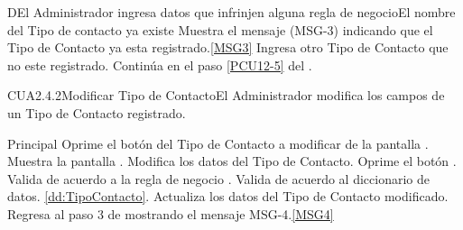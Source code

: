         \begin{UCtrayectoriaA}{D}{El Administrador ingresa datos que infrinjen alguna regla de negocio}{El nombre del Tipo de contacto ya existe}
                        \UCpaso Muestra el mensaje (MSG-3) indicando que el Tipo de Contacto ya esta registrado.\ref{MSG3}
			\UCpaso[\UCactor] Ingresa otro Tipo de Contacto que no este registrado.
			\UCpaso Continúa en el paso \ref{PCU12-5} del .
	\end{UCtrayectoriaA}



	\begin{UseCase}{CUA2.4.2}{Modificar Tipo de Contacto}{El Administrador modifica los campos de un Tipo de Contacto registrado.}
	\end{UseCase}

	\begin{UCtrayectoria}{Principal}
			\UCpaso[\UCactor] Oprime el botón  del Tipo de Contacto a modificar de la pantalla .
			\UCpaso Muestra la pantalla .
                        \UCpaso [\UCactor] Modifica los datos del Tipo de Contacto.
                       	\UCpaso [\UCactor] Oprime el botón .
                        \UCpaso Valida de acuerdo a la regla de negocio .  
                        \UCpaso Valida de acuerdo al diccionario de datos. \ref{dd:TipoContacto}.
			\UCpaso Actualiza los datos del Tipo de Contacto modificado.
			\UCpaso Regresa al paso 3 de  mostrando el mensaje MSG-4.\ref{MSG4}
	\end{UCtrayectoria}

